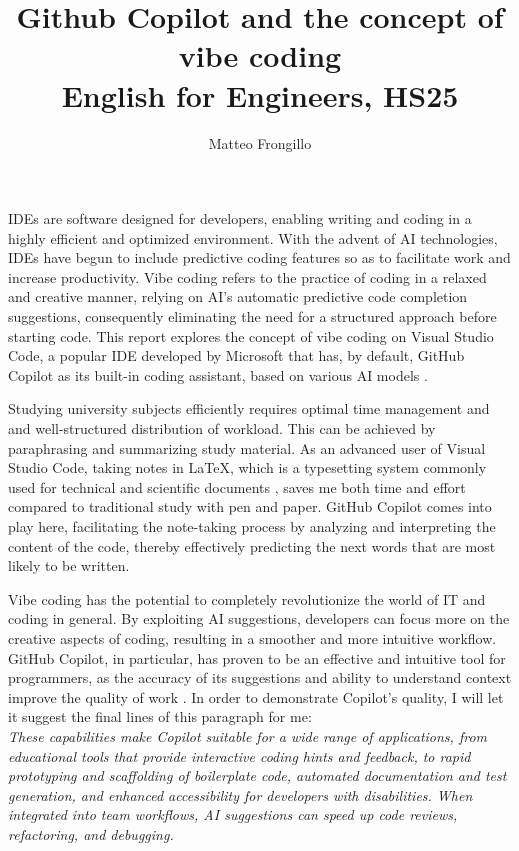 \documentclass{article}
\title{\textbf{Github Copilot and the concept of vibe coding \\ English for Engineers, HS25}}
\author{Matteo Frongillo}
\date{}
\begin{document}
\hypersetup{citecolor=black}
\maketitle
\linespread{1.2}\selectfont

IDEs are software designed for developers, enabling writing and coding in a
highly efficient and optimized environment. With the advent of AI technologies,
IDEs have begun to include predictive coding features so as to facilitate work
and increase productivity. Vibe coding refers to the practice of coding in a
relaxed and creative manner, relying on AI's automatic predictive code
completion suggestions, consequently eliminating the need for a structured
approach before starting code.
This report explores the concept of vibe coding on Visual Studio Code, a
popular IDE developed by Microsoft that has, by default, GitHub Copilot as
its built-in coding assistant, based on various AI models \parencite{vscode-overview}.
\vspace*{.25cm}

Studying university subjects efficiently requires optimal time management and
and well-structured distribution of workload. This can be achieved by
paraphrasing and summarizing study material. As an advanced user of
Visual Studio Code, taking notes in LaTeX, which is a typesetting system
commonly used for technical and scientific documents \parencite{latex},
saves me both time and effort compared to traditional study with pen and paper.
GitHub Copilot comes into play here, facilitating the note-taking process by
analyzing and interpreting the content of the code, thereby effectively
predicting the next words that are most likely to be written.
\vspace*{.25cm}

Vibe coding has the potential to completely revolutionize the world of IT and
coding in general. By exploiting AI suggestions, developers can focus more on
the creative aspects of coding, resulting in a smoother and more intuitive
workflow. GitHub Copilot, in particular, has proven to be an effective and
intuitive tool for programmers, as the accuracy of its suggestions and ability
to understand context improve the quality of work \parencite{vscode-inline}.
In order to demonstrate Copilot's quality, I will let it suggest the final
lines of this paragraph for me:\\
\textit{These capabilities make Copilot suitable for a wide range of applications,
from educational tools that provide interactive coding hints and feedback, to
rapid prototyping and scaffolding of boilerplate code, automated documentation
and test generation, and enhanced accessibility for developers with
disabilities. When integrated into team workflows, AI suggestions can speed up
code reviews, refactoring, and debugging.}
\vspace*{.25cm}
\end{document}
